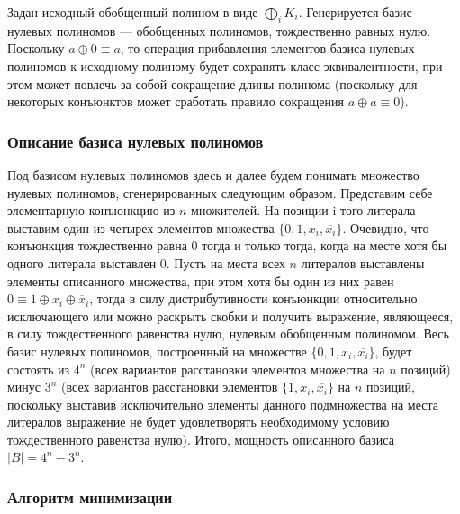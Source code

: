 \documentclass[a4paper,12pt,titlepage]{article}
\begin{document}
Задан исходный обобщенный полином в виде $ \bigoplus\limits_i K_i $. Генерируется базис нулевых полиномов --- обобщенных полиномов, тождественно равных нулю. Поскольку $ a \oplus 0 \equiv a $, то операция прибавления элементов базиса нулевых полиномов к исходному полиному будет сохранять класс эквивалентности, при этом может повлечь за собой сокращение длины полинома (поскольку для некоторых конъюнктов может сработать правило сокращения $ a \oplus a \equiv 0 $).

\subsubsection{Описание базиса нулевых полиномов}
Под базисом нулевых полиномов здесь и далее будем понимать множество нулевых полиномов, сгенерированных следующим образом.
Представим себе элементарную конъюнкцию из $ n $ множителей. На позиции i-того литерала выставим один из четырех элементов множества $ \{ 0, 1, x_i, \overline{x_i} \} $. Очевидно, что конъюнкция тождественно равна 0 тогда и только тогда, когда на месте хотя бы одного литерала выставлен 0. Пусть на места всех $ n $ литералов выставлены элементы описанного множества, при этом хотя бы один из них равен $ 0 \equiv 1 \oplus x_i \oplus \overline x_i $, тогда в силу дистрибутивности конъюнкции относительно исключающего или можно раскрыть скобки и получить выражение, являющееся, в силу тождественного равенства нулю, нулевым обобщенным полиномом. Весь базис нулевых полиномов, построенный на множестве $ \{ 0, 1, x_i, \overline{x_i} \} $, будет состоять из $ 4^n $ (всех вариантов расстановки элементов множества на $ n $ позиций) минус $ 3^n $ (всех вариантов расстановки элементов $ \{ 1, x_i, \overline{x_i} \} $ на $ n $ позиций, поскольку выставив исключительно элементы данного подмножества на места литералов выражение не будет удовлетворять необходимому условию тождественного равенства нулю). Итого, мощность описанного базиса $ \left| B \right| = 4^n - 3^n. $

\subsubsection{Алгоритм минимизации}
\end{document}

